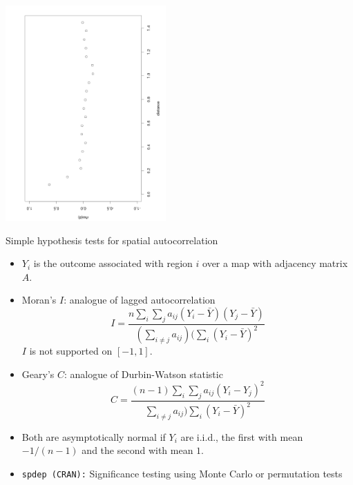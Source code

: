 \documentclass[10pt]{beamer}
\begin{document}
\begin{frame}
 
\begin{center}
\includegraphics[height=3.25in, angle=-90] {figs/ScallopsCorrelograms.png}
\end{center}

\end{frame}

\begin{frame}{Simple hypothesis tests for spatial autocorrelation}
 \begin{itemize}\setlength{\itemsep}{0.3cm}

\item $Y_i$ is the outcome associated with region $i$ over a map with adjacency matrix $A$.

\item Moran's $I$:  analogue of lagged autocorrelation
$$I=
\frac{n\sum_{i}\sum_{j}a_{ij}(Y_{i}-\bar{Y})(Y_{j}-\bar{Y})}{(\sum_{i
    \neq j}a_{ij})(\sum_{i}(Y_{i}-\bar{Y})^2}$$
$I$ is not supported on $[-1,1]$.

\item Geary's $C$:  analogue of Durbin-Watson statistic
$$C=\frac{(n-1)\sum_{i}\sum_{j}a_{ij}(Y_{i}-Y_{j})^2}{\sum_{i \neq j}a_{ij})\sum_{i}(Y_{i}-\bar{Y})^2}$$

\item Both are asymptotically normal if $Y_{i}$ are i.i.d., the first with mean $-1/(n-1)$ and the second with mean $1$.


\item \texttt{spdep (CRAN):} Significance testing using Monte Carlo or permutation tests
\end{itemize}
\end{frame}
\end{document}
